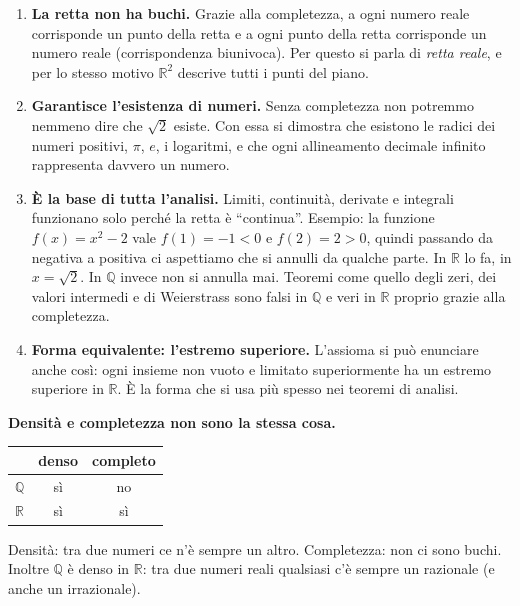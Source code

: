 \documentclass[11pt,a4paper]{article}
\begin{document}
\begin{enumerate}
    \item \textbf{La retta non ha buchi.} Grazie alla completezza, a ogni
          numero reale corrisponde un punto della retta e a ogni punto
          della retta corrisponde un numero reale (corrispondenza
          biunivoca). Per questo si parla di \emph{retta reale}, e per lo
          stesso motivo $\mathbb{R}^2$ descrive tutti i punti del piano.
    \item \textbf{Garantisce l'esistenza di numeri.} Senza completezza
          non potremmo nemmeno dire che $\sqrt{2}$ esiste. Con essa si
          dimostra che esistono le radici dei numeri positivi, $\pi$, $e$,
          i logaritmi, e che ogni allineamento decimale infinito
          rappresenta davvero un numero.
    \item \textbf{È la base di tutta l'analisi.} Limiti, continuità,
          derivate e integrali funzionano solo perché la retta è
          ``continua''. Esempio: la funzione $f(x) = x^2 - 2$ vale
          $f(1) = -1 < 0$ e $f(2) = 2 > 0$, quindi passando da negativa a
          positiva ci aspettiamo che si annulli da qualche parte. In
          $\mathbb{R}$ lo fa, in $x = \sqrt{2}$. In $\mathbb{Q}$ invece
          non si annulla mai. Teoremi come quello degli zeri, dei valori
          intermedi e di Weierstrass sono falsi in $\mathbb{Q}$ e veri in
          $\mathbb{R}$ proprio grazie alla completezza.
    \item \textbf{Forma equivalente: l'estremo superiore.} L'assioma si
          può enunciare anche così: ogni insieme non vuoto e limitato
          superiormente ha un estremo superiore in $\mathbb{R}$. È la forma
          che si usa più spesso nei teoremi di analisi.
\end{enumerate}

\textbf{Densità e completezza non sono la stessa cosa.}
\begin{center}
\begin{tabular}{l|c|c}
                & denso & completo \\ \hline
$\mathbb{Q}$    & sì    & no       \\
$\mathbb{R}$    & sì    & sì
\end{tabular}
\end{center}
Densità: tra due numeri ce n'è sempre un altro. Completezza: non ci sono
buchi. Inoltre $\mathbb{Q}$ è denso in $\mathbb{R}$: tra due numeri reali
qualsiasi c'è sempre un razionale (e anche un irrazionale).
\end{document}
